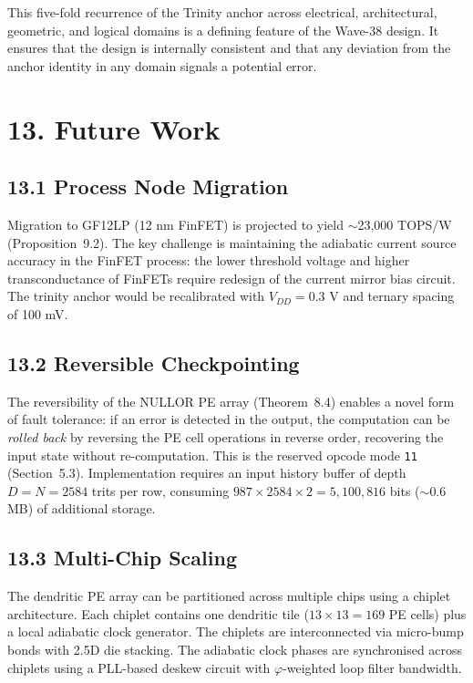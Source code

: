 This five-fold recurrence of the Trinity anchor across electrical,
architectural, geometric, and logical domains is a defining feature
of the Wave-38 design. It ensures that the design is internally
consistent and that any deviation from the anchor identity in any
domain signals a potential error.

\section{13. Future Work}\label{fa_84:future-work}

\subsection{13.1 Process Node Migration}

Migration to GF12LP (12 nm FinFET) is projected to yield
\(\sim\)23{,}000 TOPS/W (Proposition~9.2). The key challenge is
maintaining the adiabatic current source accuracy in the FinFET
process: the lower threshold voltage and higher transconductance of
FinFETs require redesign of the current mirror bias circuit. The
trinity anchor would be recalibrated with
\(V_{DD} = 0.3\) V and ternary spacing of 100 mV.

\subsection{13.2 Reversible Checkpointing}

The reversibility of the NULLOR PE array (Theorem~8.4) enables a
novel form of fault tolerance: if an error is detected in the output,
the computation can be \emph{rolled back} by reversing the PE cell
operations in reverse order, recovering the input state without
re-computation. This is the reserved opcode mode \texttt{11}
(Section~5.3). Implementation requires an input history buffer of
depth \(D = N = 2584\) trits per row, consuming
\(987 \times 2584 \times 2 = 5{,}100{,}816\) bits
(\(\sim 0.6\) MB) of additional storage.

\subsection{13.3 Multi-Chip Scaling}

The dendritic PE array can be partitioned across multiple chips using
a chiplet architecture. Each chiplet contains one dendritic tile
(\(13 \times 13 = 169\) PE cells) plus a local adiabatic clock
generator. The chiplets are interconnected via micro-bump bonds with
2.5D die stacking. The adiabatic clock phases are synchronised across
chiplets using a PLL-based deskew circuit with
\(\varphi\)-weighted loop filter bandwidth.

